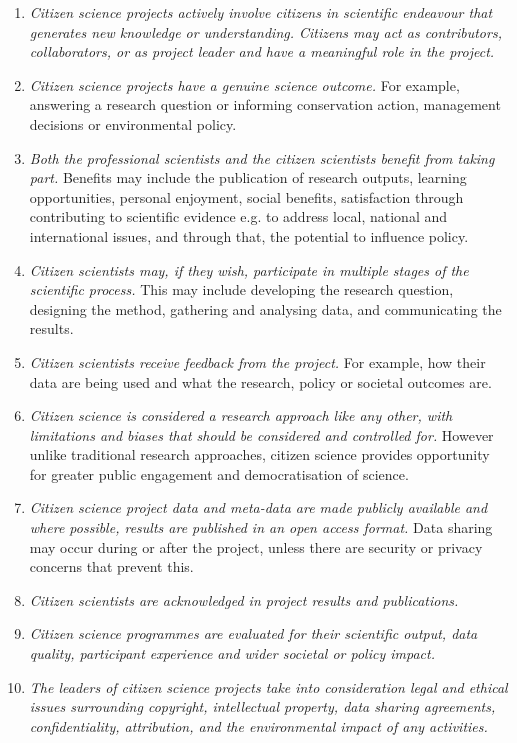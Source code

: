 \begin{enumerate}
\item \textit{Citizen science projects actively involve citizens in scientific endeavour that generates new
knowledge or understanding. Citizens may act as contributors, collaborators, or as project
leader and have a meaningful role in the project.}
\item \textit{Citizen science projects have a genuine science outcome.} For example, answering a research
question or informing conservation action, management decisions or environmental policy.
\item \textit{Both the professional scientists and the citizen scientists benefit from taking part.} Benefits
may include the publication of research outputs, learning opportunities, personal enjoyment,
social benefits, satisfaction through contributing to scientific evidence e.g. to address local,
national and international issues, and through that, the potential to influence policy.
\item \textit{Citizen scientists may, if they wish, participate in multiple stages of the scientific process.} This may include developing the research question, designing the method, gathering and
analysing data, and communicating the results.
\item \textit{Citizen scientists receive feedback from the project.} For example, how their data are being used
and what the research, policy or societal outcomes are.
\item \textit{Citizen science is considered a research approach like any other, with limitations and biases
that should be considered and controlled for.} However unlike traditional research approaches,
citizen science provides opportunity for greater public engagement and democratisation of
science.
\item \textit{Citizen science project data and meta-data are made publicly available and where possible,
results are published in an open access format.} Data sharing may occur during or after the
project, unless there are security or privacy concerns that prevent this.
\item \textit{Citizen scientists are acknowledged in project results and publications.}
\item \textit{Citizen science programmes are evaluated for their scientific output, data quality, participant
experience and wider societal or policy impact.}
\item \textit{The leaders of citizen science projects take into consideration legal and ethical issues
surrounding copyright, intellectual property, data sharing agreements, confidentiality,
attribution, and the environmental impact of any activities.}
\end{enumerate}

